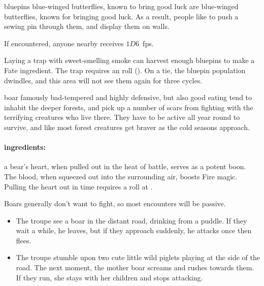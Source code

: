 \begin{multicols}{2}
  {bluepins}%
  {blue-winged butterflies, known to bring good luck}%
are blue-winged butterflies, known for bringing good luck.
As a result, people like to push a sewing pin through them, and display them on walls.

If encountered, anyone nearby receives $1D6$~\glspl{fp}.

Laying a trap with sweet-smelling smoke can harvest enough bluepins to make a Fate \gls{ingredient}.
The trap requires an  roll (\tn[12]).
On a tie, the bluepin population dwindles, and this area will not see them again for three \glspl{cycle}.

  {boar}%
  {famously bad-tempered and highly defensive, but also good eating}%
tend to inhabit the deeper forests, and pick up a number of scars from fighting with the terrifying creatures who live there.
They have to be active all year round to survive, and like most forest creatures get braver as the cold seasons approach.

\boar

\paragraph{\Glspl{ingredient}:}
a bear's heart, when pulled out in the heat of battle, serves as a potent \gls{boon}.
The blood, when squeezed out into the surrounding air, boosts Fire magic.
Pulling the heart out in time requires a  roll at \tn[10].

\showEnc
Boars generally don't want to fight, so most encounters will be passive.

\begin{itemize}

  \item
  The troupe see a boar in the distant road, drinking from a puddle.
  If they wait a while, he leaves, but if they approach suddenly, he attacks once then flees.
  \item
  The troupe stumble upon two cute little wild piglets playing at the side of the road.
  The next moment, the mother boar screams and rushes towards them.
  If they run, she stays with her children and stops attacking.

\end{itemize}


\end{multicols}
